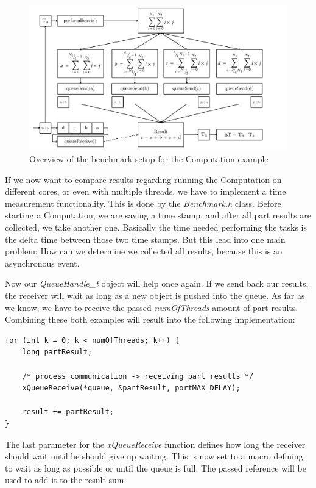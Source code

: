 \begin{figure}[htbp]
	\centerline{\includegraphics[width=1.1\linewidth]{images/Split-Sum-Message-Passing.pdf}}
	\caption{ Overview of the benchmark setup for the Computation example }
	\label{fig:splitSumOverview}
\end{figure}

\noindent If we now want to compare results regarding running the Computation on different cores, or even with multiple threads, we have to implement a time measurement functionality. This is done by the \textit{Benchmark.h} class. Before starting a Computation, we are saving a time stamp, and after all part results are collected, we take another one. Basically the time needed performing the tasks is the delta time between those two time stamps. But this lead into one main problem: How can we determine we collected all results, because this is an asynchronous event. 

Now our \textit{QueueHandle\_t} object will help once again. If we send back our results, the receiver will wait as long as a new object is pushed into the queue. As far as we know, we have to receive the passed \textit{numOfThreads} amount of part results. Combining these both examples will result into the following implementation:

\begin{lstlisting}[label={code:queueReceive}]
for (int k = 0; k < numOfThreads; k++) {
	long partResult;

	/* process communication -> receiving part results */
	xQueueReceive(*queue, &partResult, portMAX_DELAY);

	result += partResult;
}
\end{lstlisting}  

The last parameter for the \textit{xQueueReceive} function defines how long the receiver should wait until he should give up waiting. This is now set to a macro defining to wait as long as possible or until the queue is full. The passed reference will be used to add it to the result sum.

